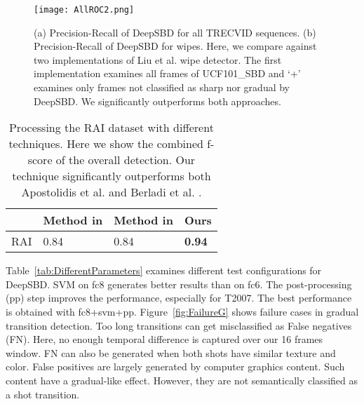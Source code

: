 \documentclass[journal]{IEEEtran}
\begin{document}
\begin{figure*}
  \centering
   \texttt{[image: AllROC2.png]}
   \caption{(a) Precision-Recall of DeepSBD for all TRECVID sequences. (b) Precision-Recall of DeepSBD for wipes. Here, we compare against two implementations of Liu et al. \cite{Liu07} wipe detector. The first implementation examines all frames of UCF101\_SBD and `+' examines only frames not classified as sharp nor gradual by DeepSBD. We significantly outperforms both approaches.}
\label{fig:AllROC}
 \end{figure*}



\begin{table}
\small
\centering
\begin{tabular}{|l | l | l | l |}
     \hline      
												                   & Method in \cite{Apostolidis14}      & Method in \cite{Berladi15}   &  Ours  \\			
			\hline
			 RAI \cite{RAIData}                         & 0.84     & 0.84       &  \textbf{0.94}  \\
			\hline
    \end{tabular}\vspace{3pt}
\caption{Processing the RAI dataset \cite{RAIData} with different techniques. Here we show the combined f-score of the overall detection. Our technique significantly outperforms both Apostolidis et al. \cite{Apostolidis14} and Berladi et al. \cite{Berladi15}.}
\label{tab:RAI}
\end{table}



Table~\ref{tab:DifferentParameters} examines different test configurations for DeepSBD. SVM on fc8 generates better results than on fc6. The post-processing (pp) step improves the performance, especially for T2007. The best performance is obtained with fc8+svm+pp. Figure~\ref{fig:FailureG} shows failure cases in gradual transition detection. Too long transitions can get misclassified as False negatives (FN). Here, no enough temporal difference is captured over our 16 frames window. FN can also be generated when both shots have similar texture and color. False positives are largely generated by computer graphics content. Such content have a gradual-like effect. However, they are not semantically classified as a shot transition.  
\end{document}
